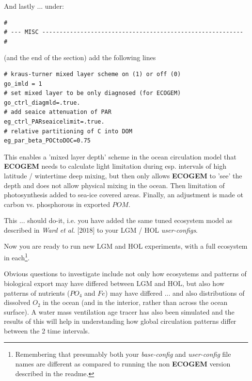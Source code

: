 \begin{enumerate}[noitemsep]
\vspace{1mm}
And lastly ... under:
\footnotesize\begin{verbatim}
#
# --- MISC ----------------------------------------------------------
#
\end{verbatim}\normalsize

(and the end of the section) add the following lines
\vspace{-1mm}\small\begin{verbatim}
# kraus-turner mixed layer scheme on (1) or off (0)
go_imld = 1
# set mixed layer to be only diagnosed (for ECOGEM)
go_ctrl_diagmld=.true.
# add seaice attenuation of PAR
eg_ctrl_PARseaicelimit=.true.
# relative partitioning of C into DOM
eg_par_beta_POCtoDOC=0.75
\end{verbatim}\normalsize\vspace{-1mm}
This enables a 'mixed layer depth' scheme in the ocean circulation model that \textbf{ECOGEM} needs to calculate light limitation during esp. intervals of high latitude / wintertime deep mixing, but then only allows \textbf{ECOGEM} to 'see' the depth and does not allow physical mixing in the ocean. Then limitation of photosynthesis added to sea-ice covered areas. Finally, an adjustment is made ot carbon vs. phosphorous in exported \(POM\).

\vspace{1mm}
This ... should do-it, i.e. you have added the same tuned ecosystem model as described in \textit{Ward et al.} [2018] to your LGM / HOL \textit{user-configs}.

\end{enumerate}

\vspace{1mm}

Now you are ready to run new LGM and HOL experiments, with a full ecosystem in each\footnote{Remembering that presumably both your \textit{base-config} and \textit{user-config} file names are  different as compared to running the non \textbf{ECOGEM} version described in the \textsf{\footnotesize readme}.}.
\vspace{1mm}

\newpage
%
Obvious questions to investigate include not only how ecosystems and patterns of biological export may have differed between LGM and HOL, but also how patterns of nutrients (\(PO_{4}\) and \(Fe\)) may have differed ... and also distributions of dissolved \(O_{2}\) in the ocean (and in the interior, rather than across the ocean surface). A water mass ventilation age tracer has also been simulated and the results of this will help in understanding how global circulation patterns differ between the 2 time intervals.

